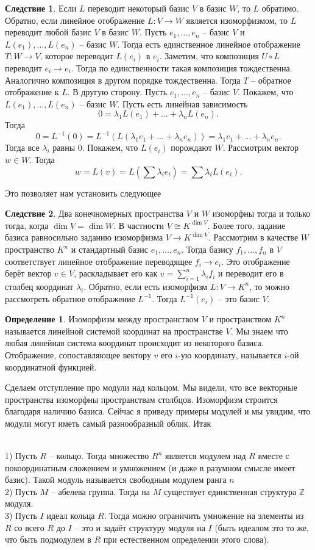 \documentclass[10pt,a4paper,oneside]{book} %
\theoremstyle{definition}
\newtheorem*{defn}{Определение}
\newtheorem{cor}{Следствие}
\newcommand{\mb}[1]{\mathbb{#1}}
\def\exm{\noindent {\bf Примеры:}}
\def\dfn{\begin{defn}}
\def\edfn{\end{defn}}
\def\crl{\begin{cor}}
\def\ecrl{\end{cor}}
\begin{document}
\crl Если $L$ переводит некоторый базис $V$ в базис $W$, то $L$ обратимо. Обратно, если линейное отображение $L \colon V \to W$ является изоморфизмом, то $L$ переводит любой базис $V$ в базис $W$. 
\proof 
Пусть $e_1,\dots,e_n$ -- базис $V$ и $L(e_1),\dots,L(e_n)$ -- базис $W$. Тогда есть единственное линейное отображение $T \colon W \to V$, которое переводит $L(e_i)$ в $e_i$. Заметим, что композиция $U\circ L$ переводит $e_i \to e_i$. Тогда по единственности такая композиция тождественна. Аналогично композиция в другом порядке тождественна. Тогда $T$ -- обратное отображение к $L$.
 В другую сторону. Пусть $e_1,\dots,e_n$ -- базис $V$. Покажем, что $L(e_1),\dots,L(e_n)$ -- базис $W$.  Пусть есть линейная зависимость  $$0=\lambda_1 L(e_1)+\dots+\lambda_n L(e_n).$$
Тогда 
$$0=L^{-1}(0)=L^{-1}(L(\lambda_1 e_1+\dots+\lambda_n e_n))=\lambda_1 e_1+\dots+\lambda_n e_n.$$
Тогда все $\lambda_i$ равны 0. Покажем, что $L(e_i)$ порождают $W$. Рассмотрим вектор $w\in W$. Тогда $$w=L(v)=L\left(\sum \lambda_i e_i\right)=\sum \lambda_i L(e_i).$$
\endproof
\ecrl

Это позволяет нам установить следующее 

\crl Два конечномерных пространства $V$ и $W$ изоморфны тогда и только тогда, когда $\dim V=\dim W$. В частности $V\cong K^{\dim V}$. Более того, задание базиса равносильно заданию изоморфизма $V\to K^{\dim V}$.
\proof
Рассмотрим в качестве $W$ пространство $K^n$ и стандартный базис $e_1,\dots,e_n$. Тогда базису $f_1,\dots,f_n$ в $V$ соответствует линейное отображение переводящее $f_i \to e_i$. Это отображение берёт вектор $v \in V$, раскладывает его как $v=\sum_{i=1}^n \lambda_i f_i$ и переводит его в столбец координат $\lambda_i$. Обратно, если есть изоморфизм $L\colon V \to K^n$, то можно рассмотреть обратное отображение $L^{-1}$. Тогда $L^{-1}(e_i)$ -- это базис $V$.
\endproof
\ecrl

\dfn
Изоморфизм между пространством $V$ и пространством $K^n$ называется линейной системой координат на пространстве $V$. Мы знаем что любая линейная система координат происходит из некоторого базиса. Отображение, сопоставляющее вектору $v$ его $i$-ую координату, называется $i$-ой координатной функцией.
\edfn

Сделаем отступление про модули над кольцом. Мы видели, что все векторные пространства изоморфны пространствам столбцов. Изоморфизм строится благодаря наличию базиса. 
Сейчас я приведу примеры модулей и мы увидим, что модули могут иметь самый разнообразный облик. Итак 


\exm\\
1) Пусть $R$ -- кольцо. Тогда множество $R^n$ является модулем над $R$ вместе с покоординатным сложением и умножением (и даже в разумном смысле имеет базис). Такой модуль называется свободным модулем ранга $n$\\
2) Пусть $M$ -- абелева группа. Тогда на $M$ существует единственная структура $\mb Z$ модуля.\\
3) Пусть $I$ идеал кольца $R$. Тогда можно ограничить умножение на элементы из $R$ со всего $R$ до  $I$ -- это и задаёт структуру модуля на $I$ (быть идеалом это то же, что быть подмодулем в $R$ при естественном определении этого слова). 
\end{document}
